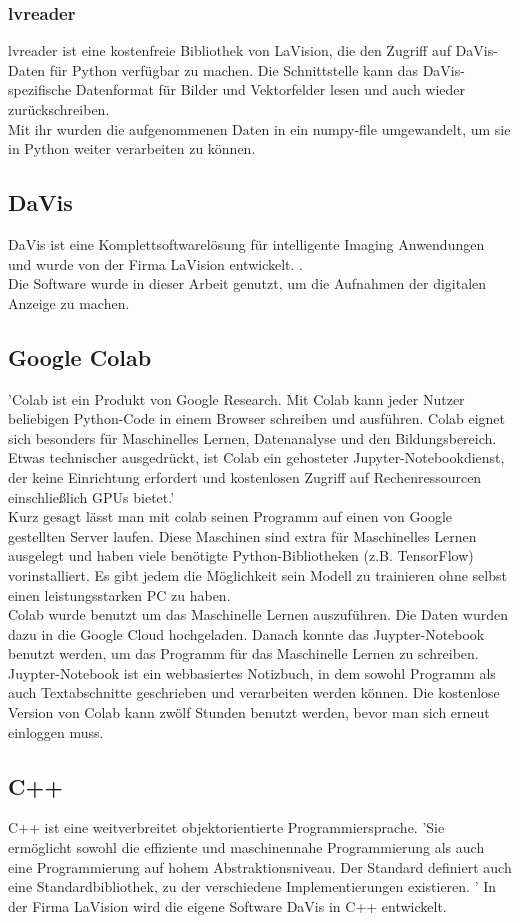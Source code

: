 \subsubsection{lvreader} 
 \label{lvreader}
lvreader ist eine kostenfreie Bibliothek von LaVision,  die den Zugriff auf DaVis-Daten für Python verfügbar zu machen.  Die Schnittstelle kann das DaVis-spezifische Datenformat für Bilder und Vektorfelder lesen und auch wieder zurückschreiben. \cite{url:lvreader-20210901}\\
Mit ihr wurden die aufgenommenen Daten in ein numpy-file umgewandelt,  um sie in Python weiter verarbeiten zu können.
\subsection{DaVis} 
\label{DaVis}
DaVis ist eine Komplettsoftwarelösung für intelligente Imaging Anwendungen  und wurde von der Firma LaVision entwickelt. \cite{url:DaVis-20210901}.\\
Die Software wurde in dieser Arbeit genutzt,  um die Aufnahmen der digitalen Anzeige zu machen.
\subsection{Google Colab}
'Colab ist ein Produkt von Google Research.  Mit Colab kann jeder Nutzer beliebigen Python-Code in einem Browser schreiben und ausführen.  Colab eignet sich besonders für Maschinelles Lernen,  Datenanalyse und den Bildungsbereich.  Etwas technischer ausgedrückt, ist Colab ein gehosteter Jupyter-Notebookdienst,  der keine Einrichtung erfordert und kostenlosen Zugriff auf Rechenressourcen einschließlich GPUs bietet.'\cite{url:Colab-20210901}\\
Kurz gesagt lässt man mit colab seinen Programm auf einen von Google gestellten Server laufen. Diese Maschinen sind extra für Maschinelles Lernen ausgelegt und haben viele benötigte Python-Bibliotheken (z.B. TensorFlow) vorinstalliert.  Es gibt jedem die Möglichkeit sein Modell zu trainieren ohne selbst einen leistungsstarken PC zu haben. \\
Colab wurde benutzt um das Maschinelle Lernen auszuführen.  Die Daten wurden dazu in die Google Cloud hochgeladen.  Danach konnte das Juypter-Notebook benutzt werden, um das Programm für das Maschinelle Lernen zu schreiben.\\
Juypter-Notebook ist ein webbasiertes Notizbuch,  in dem sowohl Programm als auch Textabschnitte geschrieben und verarbeiten werden können.
Die kostenlose Version von Colab kann zwölf Stunden benutzt werden,  bevor man sich erneut einloggen muss.
\subsection{C++}
C++ ist eine weitverbreitet objektorientierte Programmiersprache.  'Sie ermöglicht sowohl die effiziente und maschinennahe Programmierung als auch eine Programmierung auf hohem Abstraktionsniveau.  Der Standard definiert auch eine Standardbibliothek, zu der verschiedene Implementierungen existieren. '\cite{url:wiki-20210901} In der Firma LaVision wird die eigene Software DaVis in C++ entwickelt.